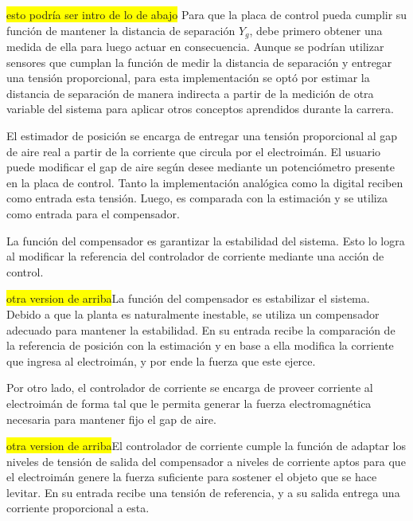 \colorbox{yellow}{esto podría ser intro de lo de abajo} Para que la placa de control pueda cumplir su función de mantener la distancia de separación $Y_{g}$, debe primero obtener una medida de ella para luego actuar en consecuencia. Aunque se podrían utilizar sensores que cumplan la función de medir la distancia de separación y entregar una tensión proporcional, para esta implementación se optó por estimar la distancia de separación de manera indirecta a partir de la medición de otra variable del sistema para aplicar otros conceptos aprendidos durante la carrera.
 
\noindent El estimador de posición se encarga de entregar una tensión proporcional al gap de aire real a partir de la corriente que circula por el electroimán. El usuario puede modificar el gap de aire según desee mediante un potenciómetro presente en la placa de control. Tanto la implementación analógica como la digital reciben como entrada esta tensión. Luego, es comparada con la estimación y se utiliza como entrada para el compensador.


\noindent La función del compensador es garantizar la estabilidad del sistema. Esto lo logra al modificar la referencia del controlador de corriente mediante una acción de control.
 
\colorbox{yellow}{otra version de arriba}La función del compensador es estabilizar el sistema. Debido a que la planta es naturalmente inestable, se utiliza un compensador adecuado para mantener la estabilidad. En su entrada recibe la comparación de la referencia de posición con la estimación y en base a ella modifica la corriente que ingresa al electroimán, y por ende la fuerza que este ejerce.

\noindent Por otro lado, el controlador de corriente se encarga de proveer corriente al electroimán de forma tal que le permita generar la fuerza electromagnética necesaria para mantener fijo el gap de aire.

\colorbox{yellow}{otra version de arriba}El controlador de corriente cumple la función de adaptar los niveles de tensión de salida del compensador a niveles de corriente aptos para que el electroimán genere la fuerza suficiente para sostener el objeto que se hace levitar. En su entrada recibe una tensión de referencia, y a su salida entrega una corriente proporcional a esta.
 